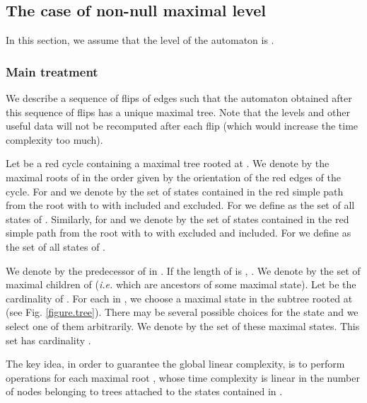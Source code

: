 \documentclass[11pt,a4paper]{article}
\newcommand{\ie}{{\itshape i.e.}\xspace }
\begin{document}
\subsection{The case of non-null maximal level}

In this section, we assume that the level of the automaton is .

\subsubsection{Main treatment}








We describe a sequence of flips of edges such that the automaton
obtained after this sequence of flips has a unique maximal tree. Note
that the levels and other useful data will not be recomputed after
each flip (which would increase the time complexity too much).


Let  be a red cycle containing a maximal tree  rooted at .
We denote by  the maximal roots of  in the
order given by the orientation of the red edges of the cycle.  For  and  we denote by  the set of states
contained in the red simple path from the root  with  to  with  included and  excluded.  For
 we define  as the set of all states of .
Similarly, for   and  we denote by 
the set of states contained in the red simple path from the root 
with  to  with  excluded and 
included.  For  we define  as the set of all states of
.


We denote by  the predecessor of  in . If the length of
 is , . We denote by  the set of maximal children
of  (\ie which are ancestors of some maximal state). Let  be
the cardinality of . For each  in , we choose a maximal
state  in the subtree rooted at  (see Fig.
\ref{figure.tree}). There may be several possible choices for the
state  and we select one of them arbitrarily. We denote by 
the set of these maximal states. This set has cardinality .

The key idea, in order to guarantee the global linear complexity, is
to perform operations for each maximal root , whose time complexity
is linear in the number of nodes belonging to trees attached to the
states contained in .
\end{document}

